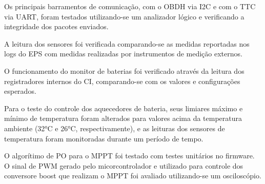 Os principais barramentos de comunicação, com o \gls{OBDH} via \gls{I2C} e com o \gls{TTC} via \gls{UART}, foram testados utilizando-se um analizador lógico e verificando a integridade dos pacotes enviados.

A leitura dos sensores foi verificada comparando-se as medidas reportadas nos logs do \gls{EPS} com medidas realizadas por instrumentos de medição externos.

O funcionamento do monitor de baterias foi verificado através da leitura dos registradores internos do CI, comparando-se com os valores e configurações esperados.

Para o teste do controle dos aquecedores de bateria, seus limiares máximo e mínimo de temperatura foram alterados para valores acima da temperatura ambiente (32°C e 26°C, respectivamente), e as leituras dos sensores de temperatura foram monitoradas durante um período de tempo.

O algorítimo de \gls{PO} para o \gls{MPPT} foi testado com testes unitários no firmware.
O sinal de \gls{PWM} gerado pelo micorcontrolador e utilizado para controle dos conversore boost que realizam o \gls{MPPT} foi avaliado utilizando-se um osciloscópio.